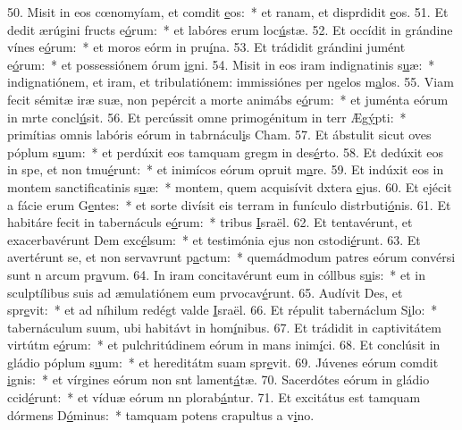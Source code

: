 50. Misit in eos cœnomyíam, et comdit \uline{e}os:~* et ranam, et disprdidit \uline{e}os.
51. Et dedit ærúgini fructs e\uline{ó}rum:~* et labóres erum loc\uline{ú}stæ.
52. Et occídit in grándine vínes e\uline{ó}rum:~* et moros eórm in pru\uline{í}na.
53. Et trádidit grándini jumént e\uline{ó}rum:~* et possessiónem órum \uline{i}gni.
54. Misit in eos iram indignatinis s\uline{u}æ:~* indignatiónem, et iram, et tribulatiónem: immissiónes per ngelos m\uline{a}los.
55. Viam fecit sémitæ iræ suæ, non pepércit a morte animábs e\uline{ó}rum:~* et juménta eórum in mrte concl\uline{ú}sit.
56. Et percússit omne primogénitum in terr Æg\uline{ý}pti:~* primítias omnis labóris eórum in tabrnácul\uline{i}s Cham.
57. Et ábstulit sicut oves póplum s\uline{u}um:~* et perdúxit eos tamquam gregm in des\uline{é}rto.
58. Et dedúxit eos in spe, et non tmu\uline{é}runt:~* et inimícos eórum opruit m\uline{a}re.
59. Et indúxit eos in montem sanctificatinis s\uline{u}æ:~* montem, quem acquisívit dxtera \uline{e}jus.
60. Et ejécit a fácie erum G\uline{e}ntes:~* et sorte divísit eis terram in funículo distrbuti\uline{ó}nis.
61. Et habitáre fecit in tabernáculs e\uline{ó}rum:~* tribus \uline{I}sraël.
62. Et tentavérunt, et exacerbavérunt Dem exc\uline{é}lsum:~* et testimónia ejus non cstodi\uline{é}runt.
63. Et avertérunt se, et non servavrunt p\uline{a}ctum:~* quemádmodum patres eórum convérsi sunt n arcum pr\uline{a}vum.
64. In iram concitavérunt eum in cóllbus s\uline{u}is:~* et in sculptílibus suis ad æmulatiónem eum prvocav\uline{é}runt.
65. Audívit Des, et spr\uline{e}vit:~* et ad níhilum redégt valde \uline{I}sraël.
66. Et répulit tabernáclum S\uline{i}lo:~* tabernáculum suum, ubi habitávt in hom\uline{í}nibus.
67. Et trádidit in captivitátem virtútm e\uline{ó}rum:~* et pulchritúdinem eórum in mans inim\uline{í}ci.
68. Et conclúsit in gládio póplum s\uline{u}um:~* et hereditátm suam spr\uline{e}vit.
69. Júvenes eórum comdit \uline{i}gnis:~* et vírgines eórum non snt lament\uline{á}tæ.
70. Sacerdótes eórum in gládio ccid\uline{é}runt:~* et víduæ eórum nn plorab\uline{á}ntur.
71. Et excitátus est tamquam dórmens D\uline{ó}minus:~* tamquam potens crapultus a v\uline{i}no.
